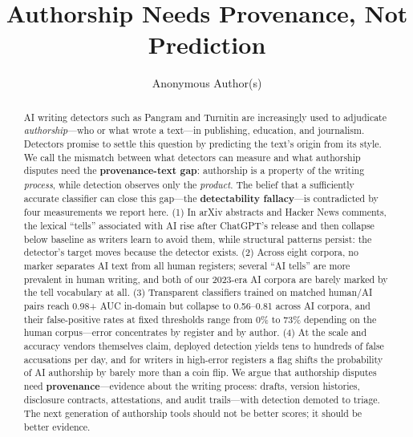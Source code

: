 \documentclass[sigconf,nonacm]{acmart}
\begin{document}
\title{Authorship Needs Provenance, Not Prediction}

\author{Anonymous Author(s)}

\begin{abstract}
AI writing detectors such as Pangram and Turnitin are increasingly used to adjudicate \emph{authorship}---who or what wrote a text---in publishing, education, and journalism. Detectors promise to settle this question by predicting the text's origin from its style. We call the mismatch between what detectors can measure and what authorship disputes need the \textbf{provenance-text gap}: authorship is a property of the writing \emph{process}, while detection observes only the \emph{product}. The belief that a sufficiently accurate classifier can close this gap---the \textbf{detectability fallacy}---is contradicted by four measurements we report here. (1) In arXiv abstracts and Hacker News comments, the lexical ``tells'' associated with AI rise after ChatGPT's release and then collapse below baseline as writers learn to avoid them, while structural patterns persist: the detector's target moves because the detector exists. (2) Across eight corpora, no marker separates AI text from all human registers; several ``AI tells'' are more prevalent in human writing, and both of our 2023-era AI corpora are barely marked by the tell vocabulary at all. (3) Transparent classifiers trained on matched human/AI pairs reach 0.98+ AUC in-domain but collapse to 0.56--0.81 across AI corpora, and their false-positive rates at fixed thresholds range from 0\% to 73\% depending on the human corpus---error concentrates by register and by author. (4) At the scale and accuracy vendors themselves claim, deployed detection yields tens to hundreds of false accusations per day, and for writers in high-error registers a flag shifts the probability of AI authorship by barely more than a coin flip. We argue that authorship disputes need \textbf{provenance}---evidence about the writing process: drafts, version histories, disclosure contracts, attestations, and audit trails---with detection demoted to triage. The next generation of authorship tools should not be better scores; it should be better evidence.
\end{abstract}


\maketitle
\end{document}
